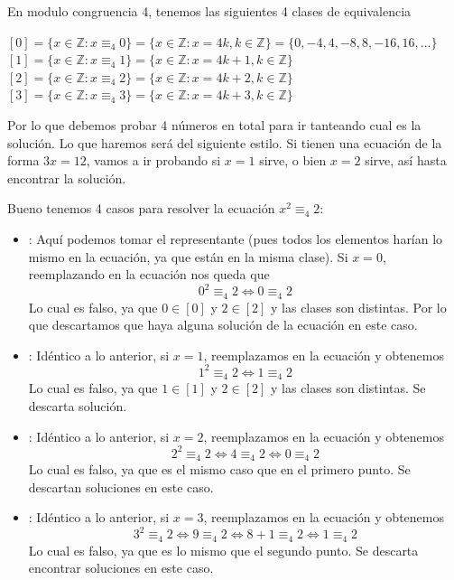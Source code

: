 \documentclass[letterpaper,11pt]{article}
\newcommand{\Z}{\mathbb Z}
\theoremstyle{plain}
\begin{document}
\begin{enumerate}
En modulo congruencia 4, tenemos las siguientes 4 clases de equivalencia

$[0]=\{x\in \Z : x \equiv_4 0\}=\{ x\in \Z  : x=4k, k\in \Z\}=\{0,-4,4,-8,8,-16,16,\dots \}$\\
$[1]=\{x\in \Z : x \equiv_4 1\}=\{ x\in \Z  : x=4k+1, k \in \Z\}$\\
$[2]=\{x\in \Z : x \equiv_4 2\}=\{ x\in \Z  : x=4k+2, k \in \Z\}$\\
$[3]=\{x\in \Z : x \equiv_4 3\}=\{ x\in \Z  : x=4k+3, k \in \Z\}$

Por lo que debemos probar 4 números en total para ir tanteando cual es la solución. Lo que haremos será del siguiente estilo. Si tienen una ecuación de la forma $3x=12$, vamos a ir probando si $x=1$ sirve, o bien $x=2$ sirve, así hasta encontrar la solución.

Bueno tenemos 4 casos para resolver la ecuación $x^2\equiv_{4} 2$:

\begin{itemize}
    \item \text{[Caso $x\in [0]$]}: Aquí podemos tomar el representante (pues todos los elementos harían lo mismo en la ecuación, ya que están en la misma clase). Si $x=0$, reemplazando en la ecuación nos queda que
    $$0^2\equiv_{4} 2  \iff 0 \equiv_4 2$$
    Lo cual es falso, ya que $0\in [0]$ y $2 \in [2]$ y las clases son distintas. Por lo que descartamos que haya alguna solución de la ecuación en este caso.
    
    \item \text{[Caso $x\in [1]$]}: Idéntico a lo anterior, si $x=1$, reemplazamos en la ecuación y obtenemos 
    $$ 1^2\equiv_{4} 2  \iff 1 \equiv_4 2$$
    Lo cual es falso, ya que $1\in [1]$ y $2 \in [2]$ y las clases son distintas. Se descarta solución.
    
    \item \text{[Caso $x\in [2]$]}: Idéntico a lo anterior, si $x=2$, reemplazamos en la ecuación y obtenemos 
    $$ 2^2\equiv_{4} 2  \iff 4 \equiv_4 2 \iff 0 \equiv_4 2$$
    Lo cual es falso, ya que es el mismo caso que en el primero punto. Se descartan soluciones en este caso.
    
    \item \text{[Caso $x\in [3]$]}: Idéntico a lo anterior, si $x=3$, reemplazamos en la ecuación y obtenemos 
    $$ 3^2\equiv_{4} 2  \iff 9 \equiv_4 2 \iff 8+1 \equiv_4 2 \iff 1 \equiv_4 2$$
    Lo cual es falso, ya que es lo mismo que el segundo punto. Se descarta encontrar soluciones en este caso.
\end{itemize}


\end{enumerate}
\end{document}
